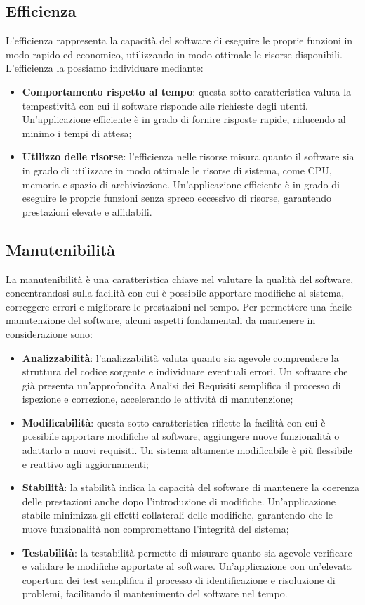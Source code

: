 \subsection{Efficienza}
L’efficienza rappresenta la capacità del software di eseguire le proprie funzioni in modo
rapido ed economico, utilizzando in modo ottimale le risorse disponibili. L’efficienza la
possiamo individuare mediante:
\begin{itemize}
    \item \textbf{Comportamento rispetto al tempo}: questa sotto-caratteristica valuta la tempestività 
    con cui il software risponde alle richieste degli utenti. Un’applicazione efficiente
    è in grado di fornire risposte rapide, riducendo al minimo i tempi di attesa;
    \item \textbf{Utilizzo delle risorse}: l’efficienza nelle risorse misura quanto il software sia in grado
    di utilizzare in modo ottimale le risorse di sistema, come CPU, memoria e spazio di
    archiviazione. Un’applicazione efficiente è in grado di eseguire le proprie funzioni senza
    spreco eccessivo di risorse, garantendo prestazioni elevate e affidabili.
\end{itemize}


\subsection{Manutenibilità}
La manutenibilità è una caratteristica chiave nel valutare la qualità del software, concentrandosi 
sulla facilità con cui è possibile apportare modifiche al sistema, correggere errori e
migliorare le prestazioni nel tempo. Per permettere una facile manutenzione del software,
alcuni aspetti fondamentali da mantenere in considerazione sono:
\begin{itemize}
    \item \textbf{Analizzabilità}: l’analizzabilità valuta quanto sia agevole comprendere 
    la struttura del codice sorgente e individuare eventuali errori. Un software che già presenta
    un’approfondita Analisi dei Requisiti semplifica il processo di ispezione e correzione,
    accelerando le attività di manutenzione;
    \item \textbf{Modificabilità}: questa sotto-caratteristica riflette la facilità con cui è possibile apportare 
    modifiche al software, aggiungere nuove funzionalità o adattarlo a nuovi requisiti.
    Un sistema altamente modificabile è più flessibile e reattivo agli aggiornamenti;
    \item \textbf{Stabilità}: la stabilità indica la capacità del software di mantenere la coerenza delle 
    prestazioni anche dopo l’introduzione di modifiche. Un’applicazione stabile minimizza 
    gli effetti collaterali delle modifiche, garantendo che le nuove funzionalità non
    compromettano l’integrità del sistema;
    \item \textbf{Testabilità}: la testabilità permette di misurare quanto sia agevole
    verificare e validare le modifiche apportate al software. Un’applicazione con un’elevata
    copertura dei test semplifica il processo di identificazione e risoluzione di problemi,
    facilitando il mantenimento del software nel tempo.
\end{itemize}


